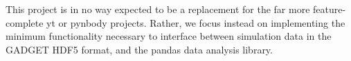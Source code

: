This project is in no way expected to be a replacement for the far more feature-complete yt or pynbody projects. Rather, we focus instead on implementing the minimum functionality necessary to interface between simulation data in the GADGET HDF5 format, and the pandas data analysis library.%
